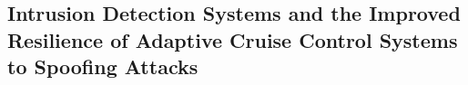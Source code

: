 \subsection*{
	Intrusion Detection Systems and the Improved Resilience
	of Adaptive Cruise Control Systems to Spoofing Attacks
}

